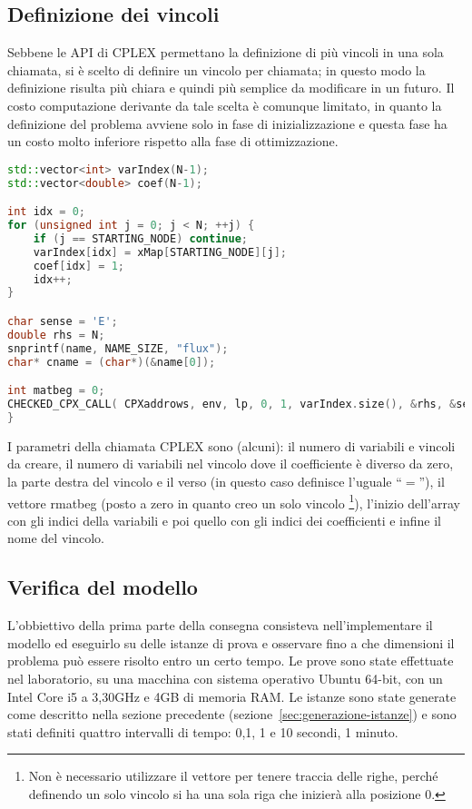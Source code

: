\subsection{Definizione dei vincoli}
Sebbene le API di CPLEX permettano la definizione di più vincoli in una sola chiamata, si è scelto di definire un vincolo per chiamata;
in questo modo la definizione risulta più chiara e quindi più semplice da modificare in un futuro.
Il costo computazione derivante da tale scelta è comunque limitato, in quanto la definizione del problema avviene solo in fase di inizializzazione
e questa fase ha un costo molto inferiore rispetto alla fase di ottimizzazione.
%
\label{lst:cplex-vincoli}
\begin{lstlisting}[language=C++, caption=Creazione di un vincolo]
std::vector<int> varIndex(N-1);
std::vector<double> coef(N-1);

int idx = 0;
for (unsigned int j = 0; j < N; ++j) {
	if (j == STARTING_NODE) continue;
	varIndex[idx] = xMap[STARTING_NODE][j];
	coef[idx] = 1;
	idx++;
}

char sense = 'E';
double rhs = N;
snprintf(name, NAME_SIZE, "flux");
char* cname = (char*)(&name[0]);

int matbeg = 0;
CHECKED_CPX_CALL( CPXaddrows, env, lp, 0, 1, varIndex.size(), &rhs, &sense, &matbeg, &varIndex[0], &coef[0], NULL, &cname );
}
\end{lstlisting}
%
I parametri della chiamata CPLEX sono (alcuni): il numero di variabili e vincoli da creare, il numero di variabili nel vincolo dove il coefficiente è
diverso da zero, la parte destra del vincolo e il verso (in questo caso definisce l'uguale ``$=$''), il vettore \textsf{rmatbeg} (posto a zero in quanto creo un solo vincolo
\footnote{Non è necessario utilizzare il vettore per tenere traccia delle righe, perché definendo un solo vincolo si ha una sola riga che inizierà alla posizione 0.}),
l'inizio dell'array con gli indici della variabili e poi quello con gli indici dei coefficienti e infine il nome del vincolo.
\subsection{Verifica del modello}\label{subsec:verifica-modello-cplex}
L'obbiettivo della prima parte della consegna consisteva nell'implementare il modello ed eseguirlo su delle istanze di prova
e osservare fino a che dimensioni il problema può essere risolto entro un certo tempo.
Le prove sono state effettuate nel laboratorio, su una macchina con sistema operativo Ubuntu 64-bit,
con un Intel Core i5 a 3,30GHz e 4GB di memoria RAM.
Le istanze sono state generate come descritto nella sezione precedente (sezione~\ref{sec:generazione-istanze})
e sono stati definiti quattro intervalli di tempo: 0,1, 1 e 10 secondi, 1 minuto.

